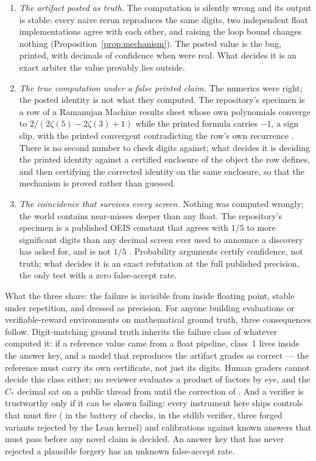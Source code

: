 \documentclass[11pt]{article}
\theoremstyle{definition}\newtheorem{observation}{Observation}
\newcommand{\Cstar}{C_{*}}
\begin{document}
\begin{enumerate}
\item\emph{The artifact posted as truth.} The computation is silently wrong and its output is stable: every naive rerun reproduces the same digits, two independent float implementations agree with each other, and raising the loop bound changes nothing (Proposition~\ref{prop:mechanism}). The posted value is the bug, printed, with \CstarPubDecimals{} decimals of confidence when \CstarCorrectDecimals{} were real. What decides it is an exact arbiter the value provably lies outside.
\item\emph{The true computation under a false printed claim.} The numerics were right; the posted identity is not what they computed. The repository's specimen is a row of a Ramanujan Machine results sheet whose own polynomials converge to $2/(2\zeta(5)-2\zeta(3)+1)$ while the printed formula carries $-1$, a sign slip, with the printed convergent contradicting the row's own recurrence \cite{RepoRM}. There is no second number to check digits against; what decides it is deciding the printed identity against a certified enclosure of the object the row defines, and then certifying the corrected identity on the same enclosure, so that the mechanism is proved rather than guessed.
\item\emph{The coincidence that survives every screen.} Nothing was computed wrongly; the world contains near-misses deeper than any float. The repository's specimen is a published OEIS constant that agrees with $1/5$ to more significant digits than any decimal screen ever used to announce a discovery has asked for, and is not $1/5$ \cite{RepoImp}. Probability arguments certify confidence, not truth; what decides it is an exact refutation at the full published precision, the only test with a zero false-accept rate.
\end{enumerate}

What the three share: the failure is invisible from inside floating point, stable under repetition, and dressed as precision. For anyone building evaluations or verifiable-reward environments on mathematical ground truth, three consequences follow. Digit-matching ground truth inherits the failure class of whatever computed it: if a reference value came from a float pipeline, class~1 lives inside the answer key, and a model that reproduces the artifact grades as correct --- the reference must carry its own certificate, not just its digits. Human graders cannot decide this class either; no reviewer evaluates a product of \CstarPrimes{} factors by eye, and the $\Cstar$ decimal sat on a public thread from \ThreadDateConstants{} until the correction of \ThreadDateCorrection{} \cite{Thread852}. And a verifier is trustworthy only if it can be shown failing: every instrument here ships controls that must fire (\BatteryReds{} in the battery of \BatteryChecks{} checks, \VerifierReds{} in the stdlib verifier, three forged variants rejected by the Lean kernel) and calibrations against known answers that must pass before any novel claim is decided. An answer key that has never rejected a plausible forgery has an unknown false-accept rate.
\end{document}
